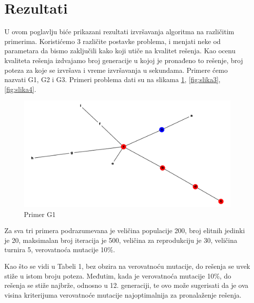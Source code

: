 \documentclass[12pt]{article}
\begin{document}
	\section{Rezultati}
	U ovom poglavlju biće prikazani rezultati izvršavanja algoritma na različitim primerima. Koristićemo 3 različite postavke problema, i menjati neke od parametara da bismo zaključili kako koji utiče na kvalitet rešenja. Kao ocenu kvaliteta rešenja izdvajamo broj generacije u kojoj je pronađeno to rešenje, broj poteza za koje se izvršava i vreme izvršavanja u sekundama. Primere ćemo nazvati G1, G2 i G3. Primeri problema dati su na slikama \ref{fig:slika2}, \ref{fig:slika3}, \ref{fig:slika4}.  
	
		\begin{figure}[h]
		\begin{center}
			\includegraphics[scale=0.45]{g1.png}
		\end{center}
		\caption{Primer G1}
		\label{fig:slika2}
	\end{figure}
	


	Za sva tri primera podrazumevana je veličina populacije 200, broj elitnih jedinki je 20, maksimalan broj iteracija je 500, veličina za reprodukciju je 30, veličina turnira 5, verovatnoća mutacije 10\%.
	\par Kao što se vidi u Tabeli 1, bez obzira na verovatnoću mutacije, do rešenja se uvek stiže u istom broju poteza. Međutim, kada je verovatnoća mutacije 10\%, do rešenja se stiže najbrže, odnosno u 12. generaciji, te ovo može sugerisati da je ova visina kriterijuma verovatnoće mutacije najoptimalnija za pronalaženje rešenja. 
	
\end{document}
